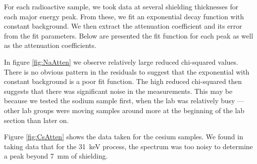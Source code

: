 \documentclass[letter]{article}
\begin{document}
For each radioactive sample, we took data at several shielding thicknesses for each major energy peak. From these, we fit an exponential decay function with constant background. We then extract the attenuation coefficient and its error from the fit parameters. Below are presented the fit function for each peak as well as the attenuation coefficients.


In figure \ref{fig:NaAtten} we observe relatively large reduced chi-squared values. There is no obvious pattern in the residuals to suggest that the exponential with constant background is a poor fit function. The high reduced chi-squared then suggests that there was significant noise in the measurements. This may be because we tested the sodium sample first, when the lab was relatively busy --- other lab groups were moving samples around more at the beginning of the lab section than later on.


Figure \ref{fig:CsAtten} shows the data taken for the cesium samples. We found in taking data that for the \qty{31}{\kilo\electronvolt} process, the spectrum was too noisy to determine a peak beyond \qty{7}{\mm} of shielding.

\end{document}
